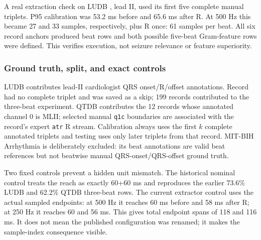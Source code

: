 \documentclass[11pt,a4paper]{article}
\newcommand{\pathcode}[1]{\texttt{\detokenize{#1}}}
\begin{document}
A real extraction check on LUDB \pathcode{data/1}, lead II, used its first five
complete manual triplets. P95 calibration was 53.2 ms before and 65.6 ms after
R. At 500 Hz this became 27 and 33 samples, respectively, plus R once: 61
samples per beat. All six record anchors produced beat rows and both possible
five-beat Gram-feature rows were defined. This verifies execution, not seizure
relevance or feature superiority.

\subsubsection{Ground truth, split, and exact controls}

LUDB contributes lead-II cardiologist QRS onset/R/offset annotations. Record
\pathcode{data/104} had no complete triplet and was saved as a skip; 199
records contributed to the three-beat experiment. QTDB contributes the 12
records whose annotated channel 0 is MLII; selected manual \texttt{q1c}
boundaries are associated with the record's expert \texttt{atr} R stream.
Calibration always uses the first $k$ complete annotated triplets and testing
uses only later triplets from that record. MIT-BIH Arrhythmia is deliberately
excluded: its beat annotations are valid beat references but not beatwise
manual QRS-onset/QRS-offset ground truth.

Two fixed controls prevent a hidden unit mismatch. The historical nominal
control treats the reach as exactly 60+60 ms and reproduces the earlier 73.6\%
LUDB and 62.2\% QTDB three-beat rows. The current extractor control uses the
actual sampled endpoints: at 500 Hz it reaches 60 ms before and 58 ms after R;
at 250 Hz it reaches 60 and 56 ms. This gives total endpoint spans of 118 and
116 ms. It does not mean the published configuration was renamed; it makes the
sample-index consequence visible.
\end{document}
